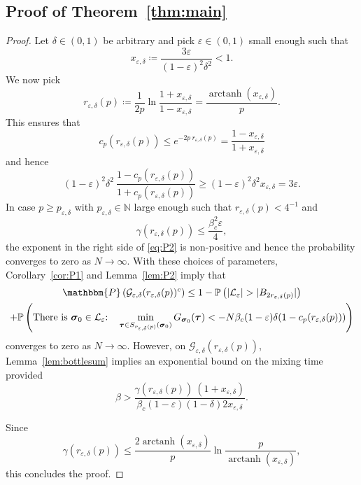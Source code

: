 \documentclass[letterpaper, DIV=17]{scrartcl}
\numberwithin{equation}{section}
\theoremstyle{definition}
\newcommand{\btau}{\boldsymbol{\tau} }
\newcommand{\bsig}{\boldsymbol{\sigma} }
\DeclareMathOperator\arctanh{arctanh}
\begin{document}
\subsection{Proof of Theorem~\ref{thm:main}}

\begin{proof}
    Let $ \delta\in (0,1) $ be arbitrary and pick $ \varepsilon \in (0, 1 ) $ small enough such that 
    $$ x_{\varepsilon,\delta} \coloneqq \frac{3\varepsilon}{(1-\varepsilon)^2\delta^2} < 1 . 
    $$
    We now pick 
    \begin{equation}\label{def:r}
        r_{\varepsilon,\delta}(p) \coloneqq \frac{1}{2p} \ln \frac{1+x_{\varepsilon,\delta} }{1- x_{\varepsilon,\delta}} = \frac{\arctanh(x_{\varepsilon,\delta})}{p} .
    \end{equation}
    This ensures that 
    $$ c_p(r_{\varepsilon,\delta}(p)) \leq e^{-2p \ r_{\varepsilon,\delta}(p)} = \frac{1-x_{\varepsilon,\delta} }{1+ x_{\varepsilon,\delta}} 
    $$
    and hence
    $$
    (1-\varepsilon)^2 \delta^2 \ \frac{1-c_p(r_{\varepsilon,\delta}(p))}{1+c_p(r_{\varepsilon,\delta}(p))} \geq (1-\varepsilon)^2 \delta^2  x_{\varepsilon,\delta} = 3 \varepsilon  . 
    $$
    In case $ p \geq p_{\varepsilon,\delta} $ with $ p_{\varepsilon,\delta} \in \mathbb{N} $ large enough such that $ r_{\varepsilon,\delta}(p) < 4^{-1} $ and 
    \begin{equation}\label{eq:upper_binary_r}
        \gamma(r_{\varepsilon,\delta}(p)) \leq \frac{\beta_c^2 \varepsilon}{4} ,
    \end{equation}
    the exponent in the right side of \eqref{eq:P2} is non-positive and hence the probability converges to zero as $ N \to \infty $. With these choices of parameters, Corollary~\ref{cor:P1} and Lemma~\ref{lem:P2} imply that
    \begin{multline*}
    \mathbbm{P}\left( \mathcal{G}_{\varepsilon,\delta}(r_{\varepsilon,\delta}(p))^c \right)\leq 1 - \mathbb{P}\left( |\mathcal{L}_\varepsilon | > |B_{2r_{\varepsilon,\delta}(p)}| \right)\\  + \mathbb{P}\left( \mbox{There is $ \bsig_0 \in \mathcal{L}_\varepsilon$:} \quad 
        \min_{\btau \in S_{r_{\varepsilon,\delta}(p)}(\bsig_0)} G_{\bsig_0}(\btau) < -N \beta_c (1-\varepsilon) \delta (1-c_p(r_{\varepsilon,\delta}(p)) ) \right)    
    \end{multline*}
    converges to zero as $ N \to \infty $. However, on $ \mathcal{G}_{\varepsilon,\delta}(r_{\varepsilon,\delta}(p)) $, Lemma~\ref{lem:bottlesum} implies an exponential bound on the mixing time provided
    \begin{equation}\label{eq:cutoff_beta}    
    \beta > \frac{\gamma(r_{\varepsilon,\delta}(p)) \ ( 1 + x_{\varepsilon,\delta}) }{ \beta_c (1-\varepsilon)(1-\delta) 2 x_{\varepsilon,\delta} } .
    \end{equation}
    
    Since $$\gamma(r_{\varepsilon,\delta}(p)) \leq \frac{2 \arctanh( x_{\varepsilon,\delta}) }{p} \ln \frac{ p }{ \arctanh( x_{\varepsilon,\delta}) } , $$ this concludes the proof. 
\end{proof}\noindent
\end{document}
